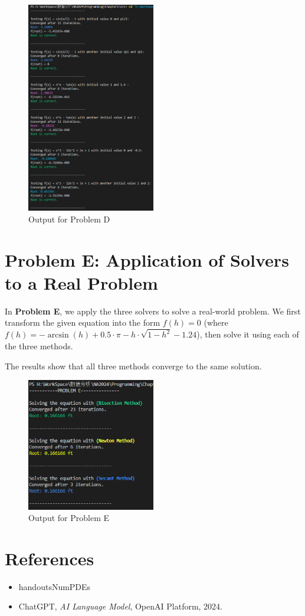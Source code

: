 \documentclass[a4paper]{article}
\begin{document}
\begin{figure}[H]  %
  \centering
  \includegraphics[width=0.5\textwidth]{./picture/ProblemD.png}
  \caption{Output for Problem D}
\end{figure}

\section{Problem E: Application of Solvers to a Real Problem}

In \textbf{Problem E}, we apply the three solvers to solve a real-world problem. We first transform the given equation into the form $f(h) = 0$ (where $f(h) = -\arcsin(h) + 0.5 \cdot \pi - h \cdot \sqrt{1 - h^2} - 1.24$), then solve it using each of the three methods.

The results show that all three methods converge to the same solution.

\begin{figure}[H]  %
  \centering
  \includegraphics[width=0.5\textwidth]{./picture/ProblemE.png}
  \caption{Output for Problem E}
\end{figure}

\section*{References}
\begin{itemize}
   \item handoutsNumPDEs
   \item ChatGPT, \textit{AI Language Model}, OpenAI Platform, 2024.
\end{itemize}
\end{document}
